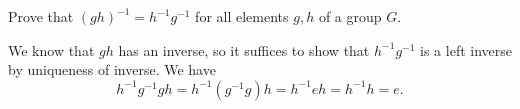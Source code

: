 \documentclass[parskip=full, draft]{scrartcl}
\begin{document}
\listoftodos
\begin{prob}{3}
    Prove that \((gh)^{-1} = h^{-1}g^{-1}\) for all elements \(g, h\) of a group \(G\).
\end{prob}
\begin{sol}
    We know that \(gh\) has an inverse, so it suffices to show that \(h^{-1}g^{-1}\) is a left inverse by uniqueness of inverse. We have
    \[
        h^{-1}g^{-1}gh = h^{-1}(g^{-1}g)h = h^{-1}eh = h^{-1} h = e.
    \]
\end{sol}
\end{document}
